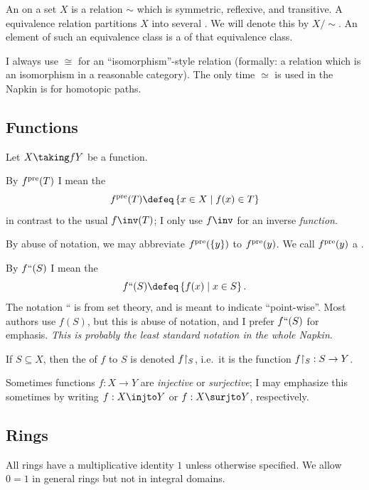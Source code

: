 
An  on a set $X$ is a relation $\sim$
which is symmetric, reflexive, and transitive.
A equivalence relation partitions $X$ into several .
We will denote this by $X / {\sim}$.
An element of such an equivalence class is a  of that equivalence class.

I always use $\cong$ for an ``isomorphism''-style relation
(formally: a relation which is an isomorphism in a reasonable category).
The only time $\simeq$ is used in the Napkin is for homotopic paths.

\subsection*{Functions}
Let $X \taking f Y$ be a function.

\begin{itemize}
\ii By $f^{\text{pre}}(T)$ I mean the 
\[ f\pre(T) \defeq \left\{ x \in X \mid f(x) \in T \right\} \]
in contrast to the usual $f\inv(T)$; I only use $f\inv$ for an inverse \emph{function}.

By abuse of notation, we may abbreviate $f^{\text{pre}}(\{y\})$ to $f^{\text{pre}}(y)$.
We call $f^{\text{pre}}(y)$ a .

\ii By $f``(S)$ I mean the 
\[ f``(S) \defeq \left\{ f(x) \mid x \in S \right\}. \]
The notation {``} is from set theory, and is meant to indicate ``point-wise''.
Most authors use $f(S)$, but this is abuse of notation,
and I prefer $f``(S)$ for emphasis.
\emph{This is probably the least standard notation in the whole Napkin}.

\ii If $S \subseteq X$, then the  of $f$ to $S$
is denoted $f \restrict{S}$,
i.e.\ it is the function $f \restrict{S} : S \to Y$.

\ii Sometimes functions $f : X \to Y$ are \emph{injective} or \emph{surjective};
I may emphasize this sometimes by writing $f : X \injto Y$ or $f : X \surjto Y$, respectively.
\end{itemize}

\subsection*{Rings}
All rings have a multiplicative identity $1$ unless otherwise specified.
We allow $0=1$ in general rings but not in integral domains.

